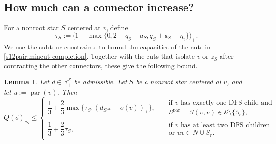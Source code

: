\documentclass[11pt]{amsart}
\DeclareMathOperator{\R}{\mathbb{R}}
\def\R{{\mathbb R}}
\newcommand{\1}{\mathbbm{1}}
\newtheorem{lemma}[theorem]{Lemma}
\begin{document}
\subsection{How much can a connector increase?}

For a nonroot star $S$ centered at $v$, define
\begin{equation}\label{s12pair:tau}
 \tau_S:=
 \bigl(1-\max\{0,2-q_S-a_S,q_S+a_S-\eta_v\}\bigr)_+.
\end{equation}
We use the subtour constraints to bound the capacities of
the cuts in \eqref{s12pair:mincut-completion}. Together with
the cuts that isolate $v$ or $z_S$ after contracting the
other connectors, these give the following bound.

\begin{lemma}\label{s12pair:connector-estimate}
{Let $d\in\R_+^{\mathcal S}$ be admissible.}
Let $S$ be a nonroot star centered at $v$, and let
$u:=\operatorname{par}(v)$. Then
\begin{equation}\label{s12pair:connector-bound}
 {Q(d)}_{c_S}\le
 \begin{cases}
  \dfrac13+\dfrac23\max\{\tau_S,(d_{S^{\mathrm{par}}}-o(v))_+\},
  &\begin{aligned}
    &\text{if $v$ has exactly one DFS child and}\\[4pt]
    &S^{\mathrm{par}}=S(u,v)\in\mathcal S\setminus\{S_r\},
   \end{aligned}\\[16pt]
  \dfrac13+\dfrac23\tau_S,
  &\begin{aligned}
    &\text{if $v$ has at least two DFS children}\\[4pt]
    &\text{or }uv\in N\cup S_r.
   \end{aligned}
 \end{cases}
\end{equation}
\end{lemma}
\end{document}
